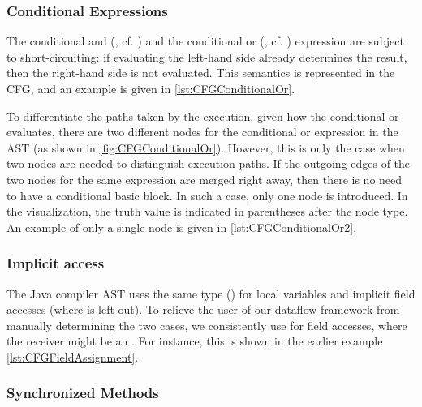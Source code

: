 \subsubsection{Conditional Expressions}
\label{sec:cond-exp}

The conditional and (\code{&&}, cf. ) and the conditional
or (\code{||}, cf. ) expression are subject to short-circuiting:
if evaluating the left-hand side already determines the result, then the right-hand
side is not evaluated. This semantics is represented in the CFG, and an example
is given in \autoref{lst:CFGConditionalOr}.

To differentiate the paths taken by the execution, given how the conditional or evaluates,
there are two different nodes for the conditional or expression in the AST
(as shown in \autoref{fig:CFGConditionalOr}). However, this is only the case when
two nodes are needed to distinguish execution paths. If the outgoing edges
of the two nodes for the same expression are merged right away, then there is
no need to have a conditional basic block. In such a case, only one
node is introduced. In the visualization, the truth value is indicated in
parentheses after the node type. An example of only a single node is given in
\autoref{lst:CFGConditionalOr2}.




\subsubsection{Implicit  access}

The Java compiler AST uses the same type () for local variables
and implicit field accesses (where  is left out).
To relieve the user of our dataflow framework from manually determining
the two cases, we consistently use  for field accesses,
where the receiver might be an .
For instance, this is shown in the earlier example \autoref{lst:CFGFieldAssignment}.


\subsubsection{Synchronized Methods}

